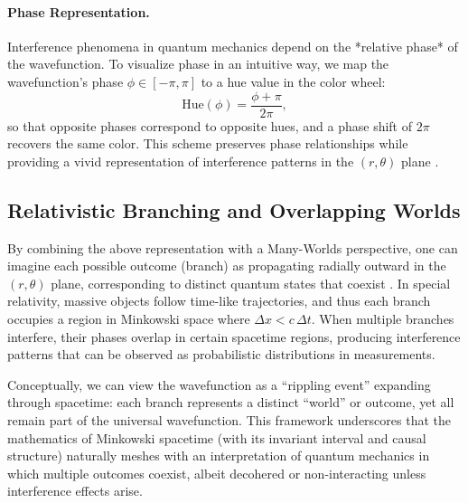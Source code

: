 \documentclass{article}
\begin{document}
\paragraph{Phase Representation.}
Interference phenomena in quantum mechanics depend on the *relative phase* of the wavefunction. To visualize phase in an intuitive way, we map the wavefunction’s phase \(\phi \in [-\pi, \pi]\) to a hue value in the color wheel:
\begin{equation}
  \text{Hue}(\phi) = \frac{\phi + \pi}{2\pi},
\end{equation}
so that opposite phases correspond to opposite hues, and a phase shift of \(2\pi\) recovers the same color. This scheme preserves phase relationships while providing a vivid representation of interference patterns in the \((r,\theta)\) plane \cite{feynmanlectures, griffiths2005introduction}.

\subsection{Relativistic Branching and Overlapping Worlds}

By combining the above representation with a Many-Worlds perspective, one can imagine each possible outcome (branch) as propagating radially outward in the \((r, \theta)\) plane, corresponding to distinct quantum states that coexist \cite{everett1957, dewitt1971}. In special relativity, massive objects follow time-like trajectories, and thus each branch occupies a region in Minkowski space where \(\Delta x < c \,\Delta t\). When multiple branches interfere, their phases overlap in certain spacetime regions, producing interference patterns that can be observed as probabilistic distributions in measurements.

Conceptually, we can view the wavefunction as a “rippling event” expanding through spacetime: each branch represents a distinct “world” or outcome, yet all remain part of the universal wavefunction. This framework underscores that the mathematics of Minkowski spacetime (with its invariant interval and causal structure) naturally meshes with an interpretation of quantum mechanics in which multiple outcomes coexist, albeit decohered or non-interacting unless interference effects arise.
\end{document}
